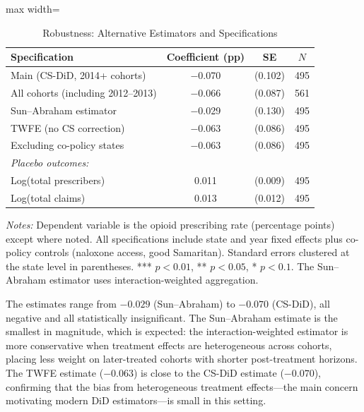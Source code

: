\documentclass[12pt]{article}
\begin{document}
\begin{table}[htbp]
\centering
\caption{Robustness: Alternative Estimators and Specifications}
\label{tab:robustness}
\begin{adjustbox}{max width=\textwidth}
\begin{threeparttable}
\begin{tabular}{lccc}
\toprule
Specification & Coefficient (pp) & SE & $N$ \\
\midrule
Main (CS-DiD, 2014+ cohorts) & $-$0.070 & (0.102) & 495 \\
All cohorts (including 2012--2013) & $-$0.066 & (0.087) & 561 \\
Sun--Abraham estimator & $-$0.029 & (0.130) & 495 \\
TWFE (no CS correction) & $-$0.063 & (0.086) & 495 \\
Excluding co-policy states & $-$0.063 & (0.086) & 495 \\
\midrule
\multicolumn{4}{l}{\textit{Placebo outcomes:}} \\
Log(total prescribers) & 0.011 & (0.009) & 495 \\
Log(total claims) & 0.013 & (0.012) & 495 \\
\bottomrule
\end{tabular}
\begin{tablenotes}
\footnotesize
\item \textit{Notes:} Dependent variable is the opioid prescribing rate (percentage points) except where noted. All specifications include state and year fixed effects plus co-policy controls (naloxone access, good Samaritan). Standard errors clustered at the state level in parentheses. *** $p<0.01$, ** $p<0.05$, * $p<0.1$. The Sun--Abraham estimator \citep{sunab2021estimating} uses interaction-weighted aggregation.
\end{tablenotes}
\end{threeparttable}
\end{adjustbox}
\end{table}

The estimates range from $-0.029$ (Sun--Abraham) to $-0.070$ (CS-DiD), all negative and all statistically insignificant. The Sun--Abraham estimate is the smallest in magnitude, which is expected: the interaction-weighted estimator is more conservative when treatment effects are heterogeneous across cohorts, placing less weight on later-treated cohorts with shorter post-treatment horizons. The TWFE estimate ($-0.063$) is close to the CS-DiD estimate ($-0.070$), confirming that the bias from heterogeneous treatment effects---the main concern motivating modern DiD estimators---is small in this setting.
\end{document}
